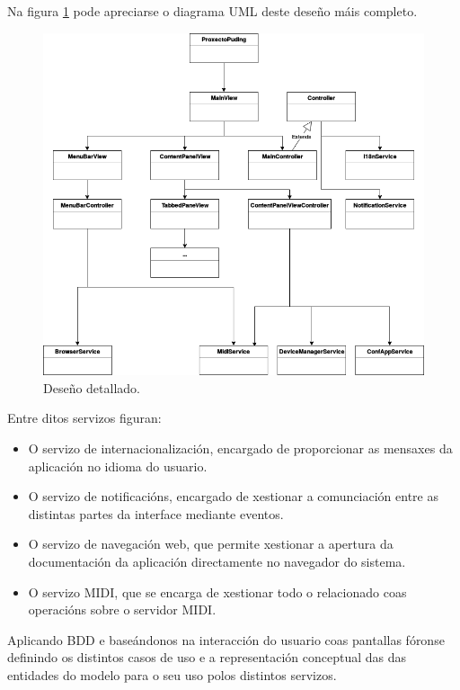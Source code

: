   Na figura \ref{figura:DesenoBaixoNivel} pode apreciarse o diagrama UML deste
  deseño máis completo.
  
  \begin{figure}[htbp]
    \centering
    \includegraphics[scale=0.6, keepaspectratio=true]{./imagenes/deseno-bn.png}
    \caption{Deseño detallado.}
    \label{figura:DesenoBaixoNivel}
   \end{figure}
  
  Entre ditos servizos figuran:
   
   \begin{itemize}
    \item O servizo de internacionalización, encargado de proporcionar as
        mensaxes da aplicación no idioma do usuario.
    \item O servizo de notificacións, encargado de xestionar a comunciación
        entre as distintas partes da interface mediante eventos.
    \item O servizo de navegación web, que permite xestionar a apertura da
        documentación da aplicación directamente no navegador do sistema.
    \item O servizo MIDI, que se encarga de xestionar todo o relacionado coas
        operacións sobre o servidor MIDI.
   \end{itemize}
   
   Aplicando BDD e baseándonos na interacción do usuario coas pantallas fóronse
   definindo os distintos casos de uso e a representación conceptual das
   das entidades do modelo para o seu uso polos distintos servizos. \\
   
